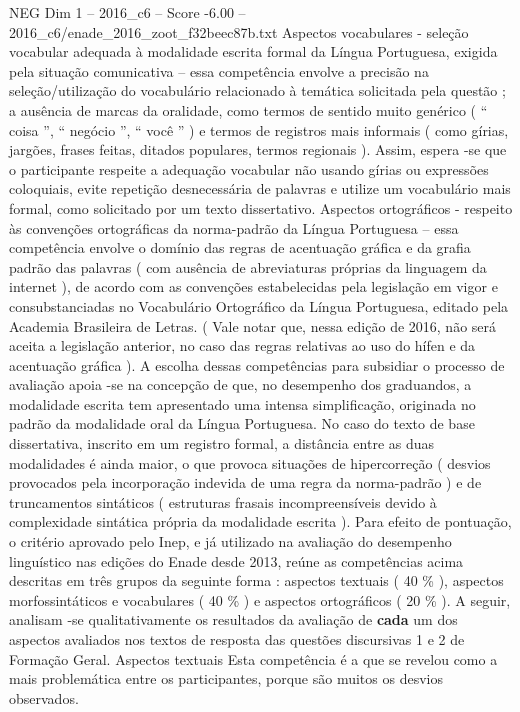 \begin{textsample}{NEG Dim 1 – 2016\_c6 – Score -6.00 – 2016\_c6/enade\_2016\_zoot\_f32beec87b.txt}
Aspectos vocabulares - seleção vocabular adequada à modalidade escrita formal da Língua Portuguesa, exigida pela situação comunicativa – essa competência envolve a precisão na seleção/utilização do vocabulário relacionado à temática solicitada pela questão ; a ausência de marcas da oralidade, como termos de sentido muito genérico ( “ coisa ”, “ negócio ”, “ você ” ) e termos de registros mais informais ( como gírias, jargões, frases feitas, ditados populares, termos regionais ).
Assim, espera -se que o participante respeite a adequação vocabular não usando gírias ou expressões coloquiais, evite repetição desnecessária de palavras e utilize um vocabulário mais formal, como solicitado por um texto dissertativo.
Aspectos ortográficos - respeito às convenções ortográficas da norma-padrão da Língua Portuguesa – essa competência envolve o domínio das regras de acentuação gráfica e da grafia padrão das palavras ( com ausência de abreviaturas próprias da linguagem da internet ), de acordo com as convenções estabelecidas pela legislação em vigor e consubstanciadas no Vocabulário Ortográfico da Língua Portuguesa, editado pela Academia Brasileira de Letras. ( Vale notar que, nessa edição de 2016, não será aceita a legislação anterior, no caso das regras relativas ao uso do hífen e da acentuação gráfica ).
A escolha dessas competências para subsidiar o processo de avaliação apoia -se na concepção de que, no desempenho dos graduandos, a modalidade escrita tem apresentado uma intensa simplificação, originada no padrão da modalidade oral da Língua Portuguesa.
No caso do texto de base dissertativa, inscrito em um registro formal, a distância entre as duas modalidades é ainda maior, o que provoca situações de hipercorreção ( desvios provocados pela incorporação indevida de uma regra da norma-padrão ) e de truncamentos sintáticos ( estruturas frasais incompreensíveis devido à complexidade sintática própria da modalidade escrita ).
Para efeito de pontuação, o critério aprovado pelo Inep, e já utilizado na avaliação do desempenho linguístico nas edições do Enade desde 2013, reúne as competências acima descritas em três grupos da seguinte forma : aspectos textuais ( 40 \% ), aspectos morfossintáticos e vocabulares ( 40 \% ) e aspectos ortográficos ( 20 \% ).
A seguir, analisam -se qualitativamente os resultados da avaliação de \textbf{cada} um dos aspectos avaliados nos textos de resposta das questões discursivas 1 e 2 de Formação Geral.
Aspectos textuais Esta competência é a que se revelou como a mais problemática entre os participantes, porque são muitos os desvios observados.

\end{textsample}
